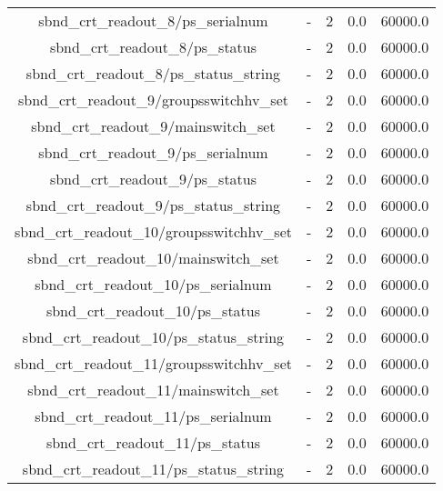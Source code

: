 \begin{center}
\begin{longtable}{c | c c c c }
sbnd\_crt\_readout\_8/ps\_serialnum & - & 2 & 0.0 & 60000.0\\ 
sbnd\_crt\_readout\_8/ps\_status & - & 2 & 0.0 & 60000.0\\ 
sbnd\_crt\_readout\_8/ps\_status\_string & - & 2 & 0.0 & 60000.0\\ 
sbnd\_crt\_readout\_9/groupsswitchhv\_set & - & 2 & 0.0 & 60000.0\\ 
sbnd\_crt\_readout\_9/mainswitch\_set & - & 2 & 0.0 & 60000.0\\ 
sbnd\_crt\_readout\_9/ps\_serialnum & - & 2 & 0.0 & 60000.0\\ 
sbnd\_crt\_readout\_9/ps\_status & - & 2 & 0.0 & 60000.0\\ 
sbnd\_crt\_readout\_9/ps\_status\_string & - & 2 & 0.0 & 60000.0\\ 
sbnd\_crt\_readout\_10/groupsswitchhv\_set & - & 2 & 0.0 & 60000.0\\ 
sbnd\_crt\_readout\_10/mainswitch\_set & - & 2 & 0.0 & 60000.0\\ 
sbnd\_crt\_readout\_10/ps\_serialnum & - & 2 & 0.0 & 60000.0\\ 
sbnd\_crt\_readout\_10/ps\_status & - & 2 & 0.0 & 60000.0\\ 
sbnd\_crt\_readout\_10/ps\_status\_string & - & 2 & 0.0 & 60000.0\\ 
sbnd\_crt\_readout\_11/groupsswitchhv\_set & - & 2 & 0.0 & 60000.0\\ 
sbnd\_crt\_readout\_11/mainswitch\_set & - & 2 & 0.0 & 60000.0\\ 
sbnd\_crt\_readout\_11/ps\_serialnum & - & 2 & 0.0 & 60000.0\\ 
sbnd\_crt\_readout\_11/ps\_status & - & 2 & 0.0 & 60000.0\\ 
sbnd\_crt\_readout\_11/ps\_status\_string & - & 2 & 0.0 & 60000.0\\ 

\hline
\end{longtable}
\end{center}


